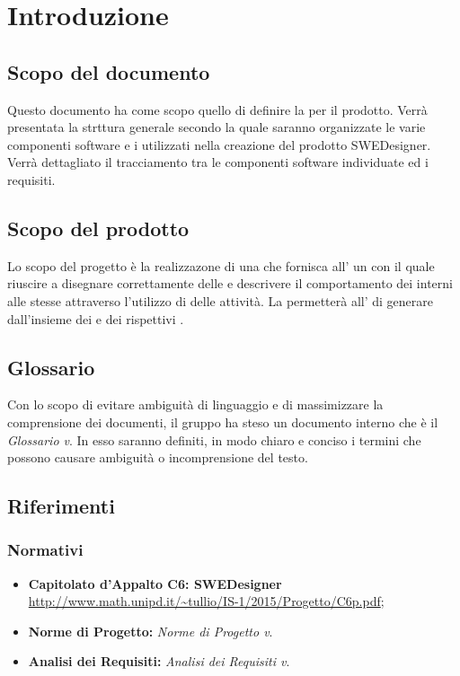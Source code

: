 \section{Introduzione}
\subsection{Scopo del documento}
Questo documento ha come scopo quello di definire la  per il prodotto. Verrà presentata la strttura generale secondo la quale saranno organizzate le varie componenti software e i  utilizzati nella creazione del prodotto SWEDesigner. Verrà dettagliato il tracciamento tra le componenti software individuate ed i requisiti. 
\subsection{Scopo del prodotto}
          Lo scopo del progetto è la realizzazone di una  che fornisca all' un   con il quale riuscire a disegnare correttamente  delle 
          e descrivere il comportamento dei  interni alle stesse attraverso l'utilizzo di  delle attività.
          La  permetterà all' di generare   dall'insieme dei  e dei rispettivi .
\subsection{Glossario}
          Con lo scopo di evitare ambiguità di linguaggio e di massimizzare la comprensione dei documenti, il
          gruppo ha steso un documento interno che è il \emph{Glossario v}\VersioneG{}. In esso saranno definiti, in modo
          chiaro e conciso i termini che possono causare ambiguità o incomprensione del testo.
\subsection{Riferimenti}
\subsubsection{Normativi}
\begin{itemize}
	\item \textbf{Capitolato d'Appalto C6: SWEDesigner} \\
		\url{http://www.math.unipd.it/~tullio/IS-1/2015/Progetto/C6p.pdf}; \\
	\item \textbf{Norme di Progetto:} \textit{Norme di Progetto v\VersioneNP}. \\
	
		\item \textbf{Analisi dei Requisiti:} \textit{Analisi dei Requisiti v\VersioneAR}. \\
\end{itemize}
